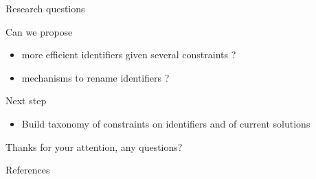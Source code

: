 \documentclass[10pt]{beamer}
\begin{document}
\begin{frame}{Research questions}
  \begin{block}{Can we propose}
    \begin{itemize}
      \item more efficient identifiers given several constraints ?
      \item mechanisms to rename identifiers ?
    \end{itemize}
  \end{block}
\end{frame}

\begin{frame}{Next step}
  \begin{itemize}
    \item Build taxonomy of constraints on identifiers and of current solutions
  \end{itemize}
\end{frame}


\begin{frame}[standout]
  Thanks for your attention, any questions?
\end{frame}

\begin{frame}[allowframebreaks]{References}
	
	
\end{frame}
\end{document}

